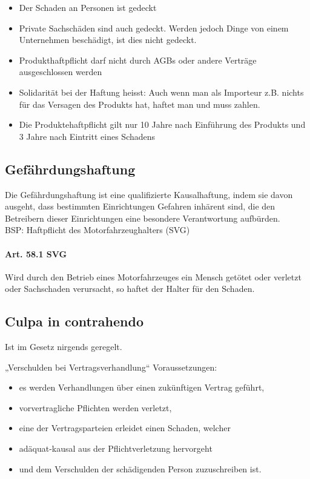 \begin{itemize}
	\tightlist
	\item Der Schaden an Personen ist gedeckt
	\item Private Sachschäden sind auch gedeckt. Werden jedoch Dinge von einem
	Unternehmen beschädigt, ist dies nicht gedeckt.
	\item Produkthaftpflicht darf nicht durch AGBs oder andere Verträge
	ausgeschlossen werden
	\item Solidarität bei der Haftung heisst: Auch wenn man als Importeur z.B.
	nichts für das Versagen des Produkts hat, haftet man und muss zahlen.
	\item Die Produktehaftpflicht gilt nur 10 Jahre nach Einführung des Produkts
	und 3 Jahre nach Eintritt eines Schadens
\end{itemize}

\subsection{Gefährdungshaftung}
\label{sec:Haftpflicht-Gefaerdungshaftung}
Die Gefährdungshaftung ist eine qualifizierte Kausalhaftung, indem sie
davon ausgeht, dass bestimmten Einrichtungen Gefahren inhärent sind, die
den Betreibern dieser Einrichtungen eine besondere Verantwortung
aufbürden.\\
BSP: Haftpflicht des Motorfahrzeughalters (SVG)

\paragraph{Art. 58.1 SVG}
Wird durch den Betrieb eines Motorfahrzeuges ein Mensch getötet oder
verletzt oder Sachschaden verursacht, so haftet der Halter für den
Schaden.


\subsection{Culpa in contrahendo}

Ist im Gesetz nirgends geregelt.

„Verschulden bei Vertragsverhandlung`` Voraussetzungen:

\begin{itemize}
	\tightlist
	\item es werden Verhandlungen über einen zukünftigen Vertrag geführt,
	\item vorvertragliche Pflichten werden verletzt,
	\item eine der Vertragsparteien erleidet einen Schaden, welcher
	\item adäquat-kausal aus der Pflichtverletzung hervorgeht
	\item und dem Verschulden der schädigenden Person zuzuschreiben ist.
\end{itemize}
